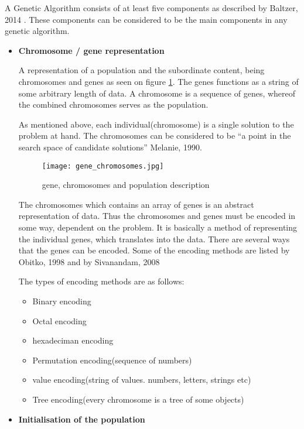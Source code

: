 A Genetic Algorithm consists of at least five components as described by Baltzer, 2014 \cite{Baltzer2014}. These components can be considered to be the main components in any genetic algorithm.
\begin{itemize}
\item \textbf{Chromosome / gene representation}

A representation of a population and the subordinate content, being chromosomes and genes as seen on figure \ref{fig:gene}.
The genes functions as a string of some arbitrary length of data. A chromosome is a sequence of genes, whereof the combined chromosomes serves as the population. \cite[pp. 41]{Sivanandam2008}

As mentioned above, each individual(chromosome) is a single solution to the problem at hand. The chromosomes can be considered to be \enquote{a point in the search space of candidate solutions} \cite[pp. 7]{Melanie1990} Melanie, 1990.


\begin{figure}[!h]
\centering
\texttt{[image: gene\_chromosomes.jpg]}
\caption{gene, chromosomes and population description}
\label{fig:gene}
\end{figure}

The chromosomes which contains an array of genes is an abstract representation of data. Thus the chromosomes and genes must be encoded in some way, dependent on the problem. It is basically a method of representing the individual genes, which translates into the data.
There are several ways that the genes can be encoded. Some of the encoding methods are listed by Obitko, 1998 \cite{Marek1998} and by Sivanandam, 2008 \cite[pp. 43]{Sivanandam2008}

The types of encoding methods are as follows:
\begin{itemize}
\item Binary encoding
\item Octal encoding
\item hexadeciman encoding
\item Permutation encoding(sequence of numbers)
\item value encoding(string of values. numbers, letters, strings etc)
\item Tree encoding(every chromosome is a tree of some objects)
\end{itemize}


\item \textbf{Initialisation of the population}


\end{itemize}
